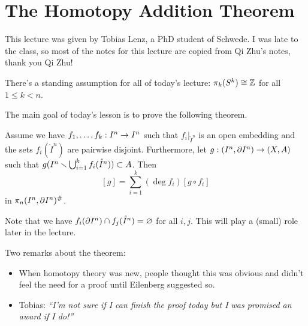 
\section{The Homotopy Addition Theorem}


This lecture was given by Tobias Lenz, a PhD student of Schwede. I was late to the class, so most of the notes for this lecture are copied from Qi Zhu's notes, thank you Qi Zhu!

\begin{remark}
There's a standing assumption for all of today's lecture: $\pi_k(S^k)\cong{\mathbb Z}$ for all $1\leq k<n$.
\end{remark}

The main goal of today's lesson is to prove the following theorem.

\begin{theorem}\label{theorem:HAT}
Assume we have ${{f}_1,\dots,{f}_{k}}:I^n\to I^n$ such that $f_i|_{\ring I^n}$ is an open embedding and the sets $f_i(\ring I^n)$ are pairwise disjoint. Furthermore, let $g:(I^n,\partial I^n)\to (X,A)$ such that $g(I^n\smallsetminus\bigcup_{i=1}^k f_i(\mathring I^n))\subset A$. Then
\[[g]=\sum_{i=1}^k(\deg f_i)[g\circ f_i]\]
in $\pi_n(I^n,\partial I^n)^\#$.
\end{theorem}

\begin{remark}
Note that we have $f_i(\partial I^n)\cap f_j(\mathring I^n)=\varnothing$ for all $i,j$. This will play a (small) role later in the lecture.
\end{remark}

\begin{remark}
Two remarks about the theorem:
\begin{itemize}
    \item When homotopy theory was new, people thought this was obvious and didn't feel the need for a proof until Eilenberg suggested so.
    \item Tobias: \emph{\enquote{I'm not sure if I can finish the proof today but I was promised an award if I do!}}
\end{itemize}
\end{remark}

